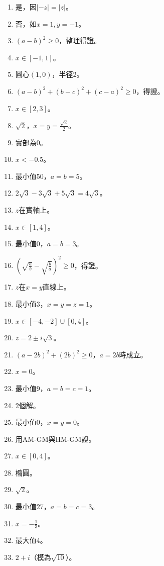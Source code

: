 \begin{enumerate}[label=\arabic*.]
    \item 是，因$|-z| = |z|$。
    \item 否，如$x = 1, y = -1$。
    \item $(a - b)^2 \geq 0$，整理得證。
    \item $x \in [-1, 1]$。
    \item 圓心$(1, 0)$，半徑2。
    \item $(a - b)^2 + (b - c)^2 + (c - a)^2 \geq 0$，得證。
    \item $x \in [2, 3]$。
    \item $\sqrt{2}$，$x = y = \frac{\sqrt{2}}{2}$。
    \item 實部為0。
    \item $x < -0.5$。
    \item 最小值50，$a = b = 5$。
    \item $2\sqrt{3} - 3\sqrt{3} + 5\sqrt{3} = 4\sqrt{3}$。
    \item $z$在實軸上。
    \item $x \in [1, 4]$。
    \item 最小值0，$a = b = 3$。
    \item $(\sqrt{\frac{a}{b}} - \sqrt{\frac{b}{a}})^2 \geq 0$，得證。
    \item $z$在$x = y$直線上。
    \item 最小值3，$x = y = z = 1$。
    \item $x \in [-4, -2] \cup [0, 4]$。
    \item $z = 2 \pm i\sqrt{3}$。
    \item $(a - 2b)^2 + (2b)^2 \geq 0$，$a = 2b$時成立。
    \item $x = 0$。
    \item 最小值9，$a = b = c = 1$。
    \item 2個解。
    \item 最小值0，$x = y = 0$。
    \item 用AM-GM與HM-GM證。
    \item $x \in [0, 4]$。
    \item 橢圓。
    \item $\sqrt{2}$。
    \item 最小值27，$a = b = c = 3$。
    \item $x = -\frac{1}{3}$。
    \item 最大值4。
    \item $2 + i$（模為$\sqrt{10}$）。
\end{enumerate}
